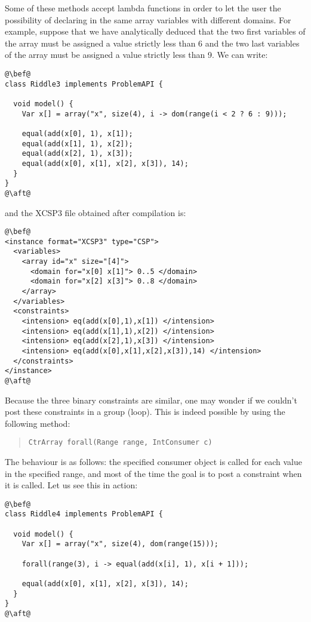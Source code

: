 \documentclass[10pt]{article}
\def\xt{{\rm XCSP3}\xspace}
\def\xt{{\rm XCSP3}\xspace}
\begin{document}
Some of these methods accept lambda functions in order to let the user the possibility of declaring in the same array variables with different domains.
For example, suppose that we have analytically deduced that the two first variables of the array must be assigned a value strictly less than 6 and the two last variables of the array must be assigned a value strictly less than 9.
We can write:

\begin{lstlisting}
@\bef@
class Riddle3 implements ProblemAPI {

  void model() {
    Var x[] = array("x", size(4), i -> dom(range(i < 2 ? 6 : 9)));
    
    equal(add(x[0], 1), x[1]);
    equal(add(x[1], 1), x[2]);
    equal(add(x[2], 1), x[3]);
    equal(add(x[0], x[1], x[2], x[3]), 14);
  }
}
@\aft@
\end{lstlisting}

and the \xt file obtained after compilation is:

\begin{lstlisting}
@\bef@
<instance format="XCSP3" type="CSP">
  <variables>
    <array id="x" size="[4]">
      <domain for="x[0] x[1]"> 0..5 </domain>
      <domain for="x[2] x[3]"> 0..8 </domain>
    </array>
  </variables>
  <constraints>
    <intension> eq(add(x[0],1),x[1]) </intension>
    <intension> eq(add(x[1],1),x[2]) </intension>
    <intension> eq(add(x[2],1),x[3]) </intension>
    <intension> eq(add(x[0],x[1],x[2],x[3]),14) </intension>
  </constraints>
</instance>
@\aft@
\end{lstlisting}

Because the three binary constraints are similar, one may wonder if we couldn't post these constraints in a group (loop).
This is indeed possible by using the following method:

\begin{quote}
\begin{verbatim}
CtrArray forall(Range range, IntConsumer c) 
\end{verbatim}
\end{quote}


The behaviour is as follows: the specified consumer object is called for each value in the specified range, and most of the time the goal is to post a constraint when it is called.
Let us see this in action:

\begin{lstlisting}
@\bef@
class Riddle4 implements ProblemAPI {

  void model() {
    Var x[] = array("x", size(4), dom(range(15)));
    
    forall(range(3), i -> equal(add(x[i], 1), x[i + 1]));

    equal(add(x[0], x[1], x[2], x[3]), 14);
  }
}
@\aft@
\end{lstlisting}
\end{document}
